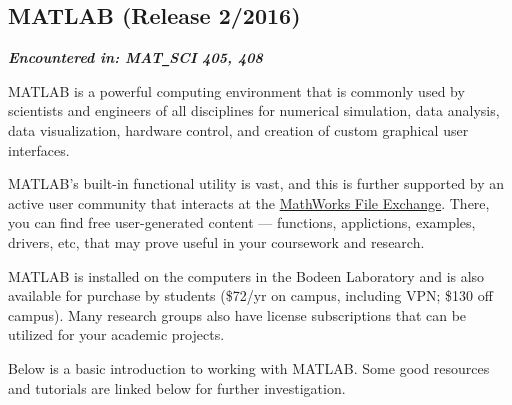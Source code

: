 \subsection{MATLAB \hfill \normalsize(Release 2/2016)} \label{sec:MATLAB}

		\textit{\textbf{Encountered in: MAT\texttt{\_}SCI 405, 408}} 

MATLAB is a powerful computing environment that is commonly used by scientists and engineers of all disciplines for numerical simulation, data analysis, data visualization, hardware control, and creation of custom graphical user interfaces.

MATLAB's built-in functional utility is vast, and this is further supported by an active user community that interacts at the \href{https://www.mathworks.com/matlabcentral/fileexchange/}{MathWorks File Exchange}. There, you can find free user-generated content --- functions, applictions, examples, drivers, etc, that may prove useful in your coursework and research. 

MATLAB is installed on the computers in the Bodeen Laboratory and is also available for purchase by students (\$72/yr on campus, including VPN; \$130 off campus). Many research groups also have license subscriptions that can be utilized for your academic projects.

Below is a basic introduction to working with MATLAB. Some good resources and tutorials are linked below for further investigation. 

